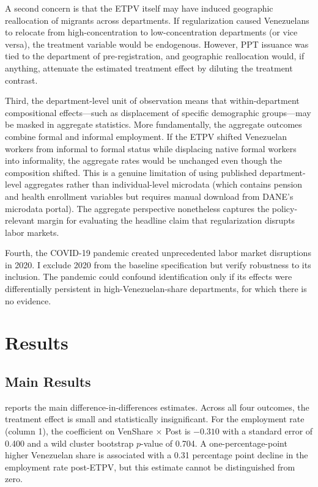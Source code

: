\documentclass[12pt]{article}
\begin{document}
A second concern is that the ETPV itself may have induced geographic reallocation of migrants across departments. If regularization caused Venezuelans to relocate from high-concentration to low-concentration departments (or vice versa), the treatment variable would be endogenous. However, PPT issuance was tied to the department of pre-registration, and geographic reallocation would, if anything, attenuate the estimated treatment effect by diluting the treatment contrast.

Third, the department-level unit of observation means that within-department compositional effects---such as displacement of specific demographic groups---may be masked in aggregate statistics. More fundamentally, the aggregate outcomes combine formal and informal employment. If the ETPV shifted Venezuelan workers from informal to formal status while displacing native formal workers into informality, the aggregate rates would be unchanged even though the composition shifted. This is a genuine limitation of using published department-level aggregates rather than individual-level microdata (which contains pension and health enrollment variables but requires manual download from DANE's microdata portal). The aggregate perspective nonetheless captures the policy-relevant margin for evaluating the headline claim that regularization disrupts labor markets.

Fourth, the COVID-19 pandemic created unprecedented labor market disruptions in 2020. I exclude 2020 from the baseline specification but verify robustness to its inclusion. The pandemic could confound identification only if its effects were differentially persistent in high-Venezuelan-share departments, for which there is no evidence.

\section{Results}

\subsection{Main Results}

 reports the main difference-in-differences estimates. Across all four outcomes, the treatment effect is small and statistically insignificant. For the employment rate (column 1), the coefficient on VenShare $\times$ Post is $-0.310$ with a standard error of 0.400 and a wild cluster bootstrap $p$-value of 0.704. A one-percentage-point higher Venezuelan share is associated with a 0.31 percentage point decline in the employment rate post-ETPV, but this estimate cannot be distinguished from zero.
\end{document}
